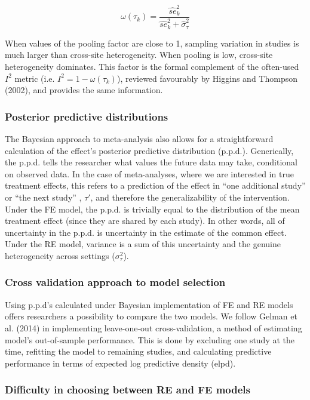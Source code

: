 \documentclass[12pt]{article}
\begin{document}
\begin{equation}
\omega(\tau_k) = \frac{\hat{se}^2_k }{\hat{se}^2_k + \hat{\sigma}_{\tau}^2 }
\end{equation}

When values of the pooling factor are close to 1, sampling variation in studies is much larger than cross-site heterogeneity. When pooling is low, cross-site heterogeneity dominates. This factor is the formal complement of the often-used $I^2$ metric (i.e. $I^2 = 1- \omega(\tau_k)$), reviewed favourably by Higgins and Thompson (2002), and provides the same information. 


\subsubsection*{Posterior predictive distributions}

The Bayesian approach to meta-analysis also allows for a straightforward calculation of the effect's posterior predictive distribution (p.p.d.). Generically, the p.p.d. tells the researcher what values the future data may take, conditional on observed data. In the case of meta-analyses, where we are interested in true treatment effects, this refers to a prediction of the effect in ``one additional study'' or ``the next study'' , $\tau'$, and therefore the generalizability of the intervention. Under the FE model, the p.p.d. is trivially equal to the distribution of the mean treatment effect (since they are shared by each study). In other words, all of uncertainty in the p.p.d. is uncertainty in the estimate of the common effect. Under the RE model, variance is a sum of this uncertainty and the genuine heterogeneity across settings ($\sigma_\tau^2$). 

\subsubsection*{Cross validation approach to model selection}

Using p.p.d's calculated under Bayesian implementation of FE and RE models offers researchers a possibility to compare the two models. We follow Gelman et al. (2014) in implementing leave-one-out cross-validation, a method of estimating model's out-of-sample performance. This is done by excluding one study at the time, refitting the model to remaining studies, and calculating predictive performance in terms of expected log predictive density (elpd).

\subsubsection*{Difficulty in choosing between RE and FE models}
\end{document}
